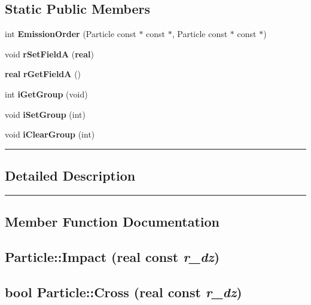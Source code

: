 \subsection*{Static Public Members}
\begin{CompactItemize}
\item 
int {\bf Emission\-Order} (Particle const $\ast$ const $\ast$, Particle const $\ast$ const $\ast$)
\item 
void {\bf r\-Set\-Field\-A} ({\bf real})
\item 
{\bf real} {\bf r\-Get\-Field\-A} ()
\item 
int {\bf i\-Get\-Group} (void)
\item 
void {\bf i\-Set\-Group} (int)
\item 
void {\bf i\-Clear\-Group} (int)
\end{CompactItemize}
\vspace{0.4cm}\hrule\vspace{0.2cm}
\subsection*{Detailed Description}
\vspace{0.4cm}\hrule\vspace{0.2cm}
\subsection*{Member Function Documentation}
\label{Particle_a0}
\subsection{ Particle::Impact ({\bf real} const {\em r\_\-dz})\hspace{0.3cm}{\tt  [inline]}}

\label{Particle_a1}
\subsection{\setlength{\rightskip}{0pt plus 5cm}bool Particle::Cross ({\bf real} const {\em r\_\-dz})\hspace{0.3cm}{\tt  [inline]}}

\label{Particle_a2}
